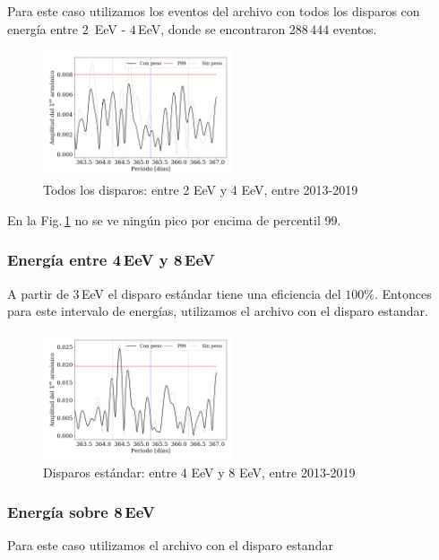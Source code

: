 Para este caso utilizamos los eventos del archivo con todos los disparos con energía entre $2\,$ EeV - $4\,$EeV, donde se encontraron $288\,444$ eventos.
\begin{figure}[H]
	\centering
	\includegraphics[width=0.5\textwidth]{2019_AllTriggers_2_4_EeV_con_vs_sin_peso.png}
	\caption{Todos los disparos: entre 2 EeV y 4 EeV, entre 2013-2019}
	\label{fig:24w}
\end{figure}

En la Fig.\,\ref{fig:24w} no se ve ningún pico por encima de  percentil 99.


\subsubsection{Energía entre 4\,EeV y 8\,EeV}

A partir de $3\,$EeV el disparo estándar tiene una eficiencia del $100\%$. Entonces para este  intervalo de energías,  utilizamos el archivo con el disparo estandar.

\begin{figure}[H]
	\centering
	\includegraphics[width=0.5\textwidth]{2019_Main_Array_4_8_EeV_con_vs_sin_peso.png}
	\caption{Disparos estándar: entre 4 EeV y 8 EeV, entre 2013-2019}
	\label{fig:48w}
\end{figure}

\subsubsection{Energía sobre 8\,EeV}

Para este caso utilizamos el archivo con el disparo estandar

